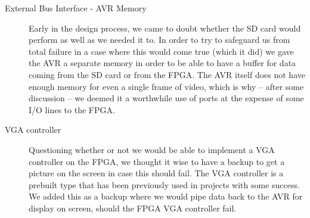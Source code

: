 \begin{description}
\item[External Bus Interface - AVR Memory]  \hfill 

Early in the design process, we came to doubt whether the \ac{SD} card would perform as well as we needed it to. In order to try to safeguard us from total failure in a case where this would come true (which it did) we gave the AVR a separate memory in order to be able to have a buffer for data coming from the \ac{SD} card or from the \ac{FPGA}. The AVR itself does not have enough memory for even a single frame of video, which is why -- after some discussion -- we deemed it a worthwhile use of ports at the expense of some \ac{I/O} lines to the FPGA.

\item[VGA controller]  \hfill

Questioning whether or not we would be able to implement a \ac{VGA} controller
on the \ac{FPGA}, we thought it wise to have a backup to get a picture on the
screen in case this should fail. The \ac{VGA} controller is a prebuilt type that
has been previously used in projects with some success. We added this as a
backup where we would pipe data back to the AVR for display on screen, should
the \ac{FPGA} \ac{VGA} controller fail.

\end{description}
